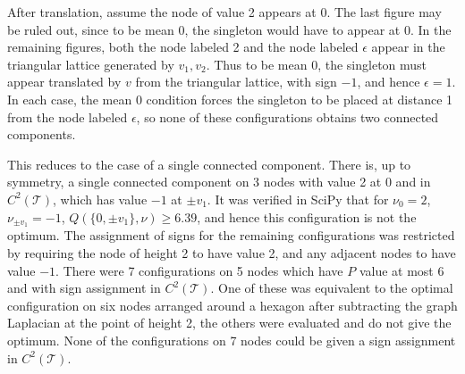 \documentclass[a4paper, 12pt, notitlepage]{amsart}
\newcommand{\sT}{\mathscr{T}}
\theoremstyle{remark}
\begin{document}
 
 After translation, assume the node of value 2 appears at 0.  The last figure may be ruled out, since to be mean 0, the singleton would have to appear at 0. In the remaining figures, both the node labeled 2 and the node labeled $\epsilon$ appear in the triangular lattice generated by $v_1, v_2$.  Thus to be mean 0, the singleton must appear translated by $v$ from the triangular lattice, with sign $-1$, and hence $\epsilon = 1$.  In each case, the mean 0 condition forces the singleton to be placed at distance 1 from the node labeled $\epsilon$, so none of these configurations obtains two connected components.  
 
 This reduces to the case of a single connected component. There is, up to symmetry, a single connected component on 3 nodes with value 2 at 0 and in $C^2(\sT)$, which has value $-1$ at $\pm v_1$. It was verified in SciPy that for $\nu_0 = 2$, $\nu_{\pm v_1} = -1$, $Q(\{0, \pm v_1\}, \nu) \geq 6.39$, and hence this configuration is not the optimum. The assignment of signs for the remaining configurations was restricted by requiring the node of height 2 to have value 2, and any adjacent nodes to have value $-1$.  There were 7 configurations on 5 nodes which have $P$ value at most 6 and with sign assignment in $C^2(\sT)$.  One of these was equivalent to the optimal configuration on six nodes arranged around a hexagon after subtracting the graph Laplacian at the point of height 2, the others were evaluated and do not give the optimum.  None of the configurations on 7 nodes could be given a sign assignment in $C^2(\sT)$.
 
 
 
\end{document}
